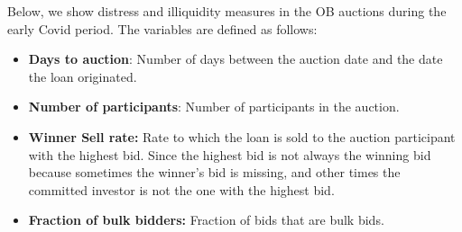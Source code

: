 \documentclass[11pt,a4paper]{article}
\begin{document}
Below, we show distress and illiquidity measures in the OB auctions during the early Covid period. The variables are defined as follows:
\begin{itemize}
\item \textbf{Days to auction}: Number of days between the auction date and the date the loan originated.
\item \textbf{Number of participants}: Number of participants in the auction.
\item  \textbf{Winner Sell rate:} Rate to which the loan is sold to the auction participant with the highest bid. Since the highest bid is not always the winning bid because sometimes the winner's bid is missing, and other times the committed investor is not the one with the highest bid. 
\item \textbf{Fraction of bulk bidders:} Fraction of bids that are bulk bids.
\end{itemize}
\end{document}
